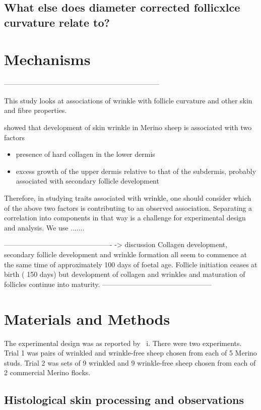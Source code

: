 \documentclass{article}
\begin{document}
\subsection{ What else does diameter corrected follicxlce curvature relate to?}

\section{Mechanisms}

------------------------------------------------------------------

This study looks at associations of wrinkle with follicle curvature and other skin and fibre properties. 

\cite{watts-2020} showed that development of skin wrinkle in Merino sheep is associated with two factors
\begin{itemize}
\item presence of hard collagen in the lower dermis 
\item excess growth of the upper dermis relative to that of the subdermis, probably associated with secondary follicle development
\end{itemize}

Therefore, in studying traits associated with wrinkle, one should consider which of the above two factors is contributing to an observed association. Separating a correlation into components in that way is a challenge for experimental design and analysis.  We use .......

----------------------------------------------  -> discussion
Collagen development, secondary follicle development and wrinkle formation  all seem to commence at the same time of approximately 100 days of foetal age.  Follicle initiation ceases at birth ( 150 days) but development of collagen and wrinkles  and maturation of follicles continue into maturity. 
-----------------------------------------------

\section{Materials and Methods}
The experimental design was as reported by ~\cite{watts-2020}i. There were  two experiments. Trial 1 was pairs of wrinkled and wrinkle-free sheep chosen from each of 5 Merino studs. Trial 2 was sets of 9 wrinkled and 9 wrinkle-free sheep chosen from each of 2 commercial Merino flocks.

\subsection{Histological skin processing and observations}
\end{document}
